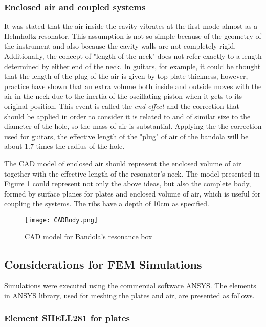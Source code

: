 \subsubsection{Enclosed air and coupled systems }

It was stated that the air inside the cavity vibrates at the first mode almost as a Helmholtz resonator. This assumption is not so simple because of the geometry of the instrument and also because the cavity walls are not completely rigid. Additionally, the concept of "length of the neck" does not refer exactly to a length determined by either end of the neck. In guitars, for example, it could be thought that the length of the plug of the air is given by top plate thickness, however, practice have shown that an extra volume both inside and outside moves with the air in the neck due to the inertia of the oscillating piston when it gets to its original position. This event is called the \emph{end effect} and the correction that should be applied in order to consider it is related to and of similar size to the diameter of the hole, so the mass of air is substantial. Applying the the correction used for guitars, the effective length of the "plug" of air of the bandola will be about 1.7 times the radius of the hole.

The CAD model of enclosed air should represent the enclosed volume of air together with the effective length of the resonator's neck. The model presented in Figure \ref{CADBody} could represent not only the above ideas, but also the complete body, formed by surface planes for plates and enclosed volume of air, which is useful for coupling the systems. The ribs have a depth of 10cm as specified.

\begin{figure}[h]
\centering
\texttt{[image: CADBody.png]}
\caption{CAD model for Bandola's resonance box}
\label{CADBody}
\end{figure}

\subsection{Considerations for FEM Simulations}

Simulations were executed using the commercial software ANSYS\textsuperscript{\textregistered}. The elements in ANSYS\textsuperscript{\textregistered} library, used for meshing the plates and air, are presented as follows.

\subsubsection{Element SHELL281 for plates}

